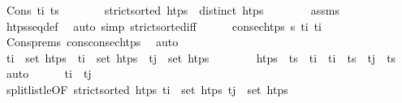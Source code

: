 \begin{isabellebody}
\ {\isacharparenleft}{\kern0pt}Cons\ t\isactrlsub i{\isacharprime}{\kern0pt}\ ts\isanewline
\ \ \ \ \isamarkupfalse%
\ \isamarkupfalse%
\ {\isachardoublequoteopen}strict{\isacharunderscore}{\kern0pt}sorted\ htps{\isachardoublequoteclose}\ \ {\isachardoublequoteopen}distinct\ htps{\isachardoublequoteclose}\isanewline
\ \ \ \ \ \ \isamarkupfalse%
\ assms\ \isamarkupfalse%
\ htps{\isacharunderscore}{\kern0pt}seq{\isacharunderscore}{\kern0pt}def\ \isamarkupfalse%
\ {\isacharparenleft}{\kern0pt}auto\ simp{\isacharcolon}{\kern0pt}\ strict{\isacharunderscore}{\kern0pt}sorted{\isacharunderscore}{\kern0pt}iff{\isacharparenright}{\kern0pt}\isanewline
\ \ \ \ \isamarkupfalse%
\ {\isachardoublequoteopen}consec{\isacharunderscore}{\kern0pt}htps\ {\isasympi}s\ t\isactrlsub i\ t\isactrlsub i{\isacharprime}{\kern0pt}{\isachardoublequoteclose}\isanewline
\ \ \ \ \ \ \isamarkupfalse%
\ Cons{\isachardot}{\kern0pt}prems\ cons{\isacharunderscore}{\kern0pt}consec{\isacharunderscore}{\kern0pt}htps\ \isamarkupfalse%
\ auto\isanewline
\ \ \ \ \isamarkupfalse%
\ {\isachardoublequoteopen}t\isactrlsub i\ {\isasymin}\ set\ htps{\isachardoublequoteclose}\ \ {\isachardoublequoteopen}t\isactrlsub i{\isacharprime}{\kern0pt}\ {\isasymin}\ set\ htps{\isachardoublequoteclose}\ \ {\isachardoublequoteopen}t\isactrlsub j\ {\isasymin}\ set\ htps{\isachardoublequoteclose}\isanewline
\ \ \ \ \ \ \isamarkupfalse%
\ {\isacartoucheopen}htps\ {\isacharequal}{\kern0pt}\ ts\ {\isacharat}{\kern0pt}\ t\isactrlsub i\ {\isacharhash}{\kern0pt}\ {\isacharparenleft}{\kern0pt}t\isactrlsub i{\isacharprime}{\kern0pt}\ {\isacharhash}{\kern0pt}\ ts\ {\isacharat}{\kern0pt}\ t\isactrlsub j\ {\isacharhash}{\kern0pt}\ ts\ \isamarkupfalse%
\ auto\isanewline
\ \ \ \ \isamarkupfalse%
\ {\isachardoublequoteopen}t\isactrlsub i\ {\isacharless}{\kern0pt}\ t\isactrlsub j{\isachardoublequoteclose}\isanewline
\ \ \ \ \ \ \isamarkupfalse%
\ split{\isacharunderscore}{\kern0pt}list{}{\isacharunderscore}{\kern0pt}le{\isacharbrackleft}{\kern0pt}OF\ {\isacartoucheopen}strict{\isacharunderscore}{\kern0pt}sorted\ htps{\isacartoucheclose}\ {\isacartoucheopen}t\isactrlsub i\ {\isasymin}\ set\ htps{\isacartoucheclose}\ {\isacartoucheopen}t\isactrlsub j\ {\isasymin}\ set\ htps{\isacartoucheclose}{\isacharbrackright}{\kern0pt}\isanewline

\end{isabellebody}
